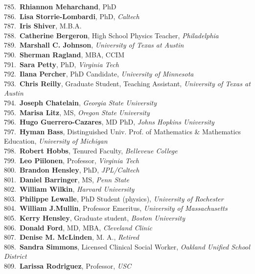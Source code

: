785.~{\bf Rhiannon Meharchand}, PhD \\
786.~{\bf Lisa Storrie-Lombardi}, PhD, {\sl Caltech} \\
787.~{\bf Iris Shiver}, M.B.A. \\
788.~{\bf Catherine Bergeron}, High School Physics Teacher, {\sl Philadelphia} \\
789.~{\bf Marshall C. Johnson}, {\sl University of Texas at Austin} \\
790.~{\bf Sherman Ragland}, MBA, CCIM \\
791.~{\bf Sara Petty}, PhD, {\sl Virginia Tech} \\
792.~{\bf Ilana Percher}, PhD Candidate, {\sl University of Minnesota} \\
793.~{\bf Chris Reilly}, Graduate Student, Teaching Assistant, {\sl University of Texas at Austin} \\
794.~{\bf Joseph Chatelain}, {\sl Georgia State University} \\
795.~{\bf Marisa Litz}, MS, {\sl Oregon State University} \\
796.~{\bf Hugo Guerrero-Cazares}, MD PhD, {\sl Johns Hopkins University} \\
797.~{\bf Hyman Bass}, Distinguished Univ. Prof. of Mathematics \& Mathematics Education, {\sl University of Michigan} \\
798.~{\bf Robert Hobbs}, Tenured Faculty, {\sl Belleveue College} \\
799.~{\bf Leo Piilonen}, Professor, {\sl Virginia Tech} \\
800.~{\bf Brandon Hensley}, PhD, {\sl JPL/Caltech} \\
801.~{\bf Daniel Barringer}, MS, {\sl Penn State} \\
802.~{\bf William Wilkin}, {\sl Harvard University} \\
803.~{\bf Philippe Lewalle}, PhD Student (physics), {\sl University of Rochester} \\
804.~{\bf William J.Mullin}, Professor Emeritus, {\sl University of Massachusetts} \\
805.~{\bf Kerry Hensley}, Graduate student, {\sl Boston University} \\
806.~{\bf Donald Ford}, MD, MBA, {\sl Cleveland Clinic} \\
807.~{\bf Denise M. McLinden}, M. A., {\sl Retired} \\
808.~{\bf Sandra Simmons}, Licensed Clinical Social Worker, {\sl Oakland Unified School District} \\
809.~{\bf Larissa Rodriguez}, Professor, {\sl USC} \\
